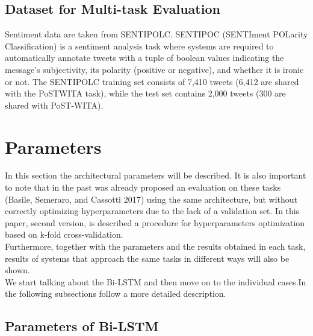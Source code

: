 \documentclass[twocolumn,10pt]{wmrDoc}
\begin{document}
\subsection{Dataset for Multi-task Evaluation}
Sentiment data are taken from SENTIPOLC.
SENTIPOC (SENTIment POLarity Classification) is a sentiment analysis task where systems are required to automatically annotate tweets with a tuple of boolean values indicating the message’s subjectivity, its polarity (positive or negative), and whether it is ironic or not.
The SENTIPOLC training set consists of 7,410 tweets (6,412 are shared with the
PoSTWITA task), while the test set contains 2,000 tweets (300 are shared with PoST-WITA).



\section{Parameters}

In this section the architectural parameters will be described. It is also important to note that in the past was already proposed an evaluation on these tasks \cite{DBLP:conf/clic-it/BasileSC17}(Basile, Semeraro, and Cassotti 2017) using the same architecture, but without correctly optimizing hyperparameters due to the lack of a validation set. In this paper, second version, is described a procedure for hyperparameters optimization based on k-fold cross-validation.\\
Furthermore, together with the parameters and the results obtained in each task, results of systems that approach the same tasks in different ways will also be shown.\\
We start talking about the Bi-LSTM and then move on to the individual cases.In the following subsections follow a more detailed description.

\subsection{Parameters of Bi-LSTM}
\end{document}
